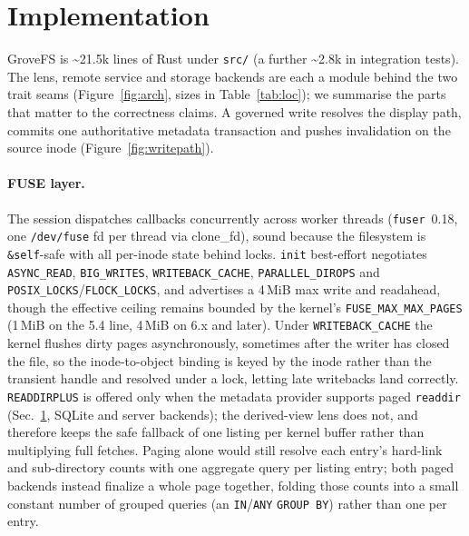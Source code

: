 \documentclass[numberedsection,acmtos]{acmart}
\begin{document}
\section{Implementation}
\label{sec:impl}
GroveFS is \textasciitilde21.5k lines of Rust under \texttt{src/} (a further
\textasciitilde2.8k in integration tests). The lens, remote service and
storage backends are each a module behind the two trait seams
(Figure~\ref{fig:arch}, sizes in Table~\ref{tab:loc}); we summarise the parts
that matter to the correctness claims. A governed write resolves the display
path, commits one authoritative metadata transaction and pushes invalidation on
the source inode (Figure~\ref{fig:writepath}).

\paragraph{FUSE layer.} The session dispatches callbacks concurrently across
worker threads (\texttt{fuser}~0.18, one \texttt{/dev/fuse} fd per thread via
clone\_fd), sound because the filesystem is \texttt{\&self}-safe with all
per-inode state behind locks. \texttt{init} best-effort negotiates
\texttt{ASYNC\_READ}, \texttt{BIG\_WRITES}, \texttt{WRITEBACK\_CACHE},
\texttt{PARALLEL\_DIROPS} and \texttt{POSIX\_LOCKS}/\texttt{FLOCK\_LOCKS}, and
advertises a 4\,MiB max write and readahead, though the effective ceiling
remains bounded by the kernel's \texttt{FUSE\_MAX\_MAX\_PAGES} (1\,MiB on the
5.4 line, 4\,MiB on 6.x and later). Under \texttt{WRITEBACK\_CACHE} the
kernel flushes dirty pages asynchronously, sometimes after the writer has closed
the file, so the inode-to-object binding is keyed by the inode rather than the
transient handle and resolved under a lock, letting late writebacks land
correctly. \texttt{READDIRPLUS} is offered only when the metadata provider
supports paged \texttt{readdir} (Sec.~\ref{sec:impl}, SQLite and server
backends); the derived-view lens does not, and therefore keeps the safe fallback
of one listing per kernel buffer rather than multiplying full fetches. Paging
alone would still resolve each entry's hard-link and sub-directory counts with
one aggregate query per listing entry; both paged backends instead finalize a
whole page together, folding those counts into a small constant number of
grouped queries (an \texttt{IN}/{\texttt{ANY}} \texttt{GROUP BY}) rather than one
per entry.
\end{document}
